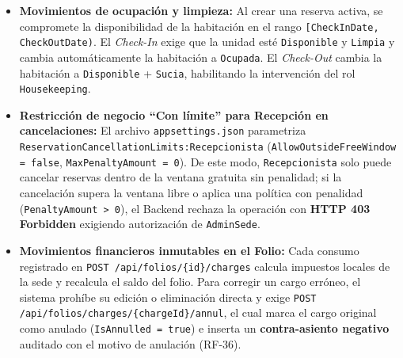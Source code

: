 \documentclass[12pt,a4paper]{article}
\begin{document}
\begin{enumerate}
    \begin{itemize}
        \item \textbf{Movimientos de ocupaci\'on y limpieza:} Al crear una reserva activa, se compromete la disponibilidad de la habitaci\'on en el rango \texttt{[CheckInDate, CheckOutDate)}. El \textit{Check-In} exige que la unidad est\'e \texttt{Disponible} y \texttt{Limpia} y cambia autom\'aticamente la habitaci\'on a \texttt{Ocupada}. El \textit{Check-Out} cambia la habitaci\'on a \texttt{Disponible} + \texttt{Sucia}, habilitando la intervenci\'on del rol \texttt{Housekeeping}.
        \item \textbf{Restricci\'on de negocio ``Con l\'imite'' para Recepci\'on en cancelaciones:} El archivo \texttt{appsettings.json} parametriza \texttt{ReservationCancellationLimits:Recepcionista} (\texttt{AllowOutsideFreeWindow = false}, \texttt{MaxPenaltyAmount = 0}). De este modo, \texttt{Recepcionista} solo puede cancelar reservas dentro de la ventana gratuita sin penalidad; si la cancelaci\'on supera la ventana libre o aplica una pol\'itica con penalidad (\texttt{PenaltyAmount > 0}), el Backend rechaza la operaci\'on con \textbf{HTTP 403 Forbidden} exigiendo autorizaci\'on de \texttt{AdminSede}.
        \item \textbf{Movimientos financieros inmutables en el Folio:} Cada consumo registrado en \texttt{POST /api/folios/\{id\}/charges} calcula impuestos locales de la sede y recalcula el saldo del folio. Para corregir un cargo err\'oneo, el sistema proh\'ibe su edici\'on o eliminaci\'on directa y exige \texttt{POST /api/folios/charges/\{chargeId\}/annul}, el cual marca el cargo original como anulado (\texttt{IsAnnulled = true}) e inserta un \textbf{contra-asiento negativo} auditado con el motivo de anulaci\'on (RF-36).
    \end{itemize}
\end{enumerate}
\end{document}

